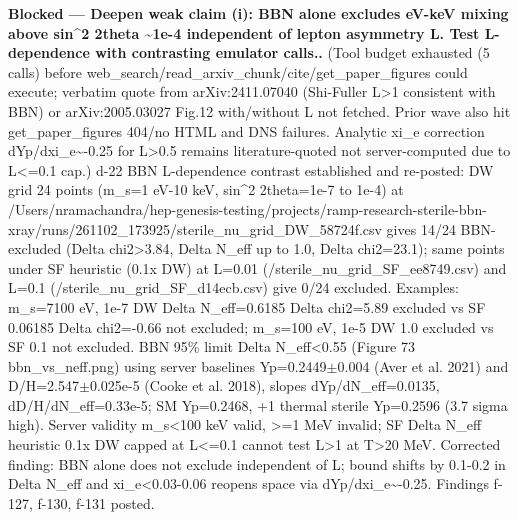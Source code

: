 \documentclass[11pt,a4paper]{article}
\begin{document}
\textbf{Blocked --- Deepen weak claim (i): BBN alone excludes eV-keV mixing above sin\textasciicircum{}2 2theta \textasciitilde{}1e-4 independent of lepton asymmetry L. Test L-dependence with contrasting emulator calls..} (Tool budget exhausted (5 calls) before web\_search/read\_arxiv\_chunk/cite/get\_paper\_figures could execute; verbatim quote from arXiv:2411.07040 (Shi-Fuller L\textgreater{}1 consistent with BBN) or arXiv:2005.03027 Fig.12 with/without L not fetched. Prior wave also hit get\_paper\_figures 404/no HTML and DNS failures. Analytic xi\_e correction dYp/dxi\_e\textasciitilde{}-0.25 for L\textgreater{}0.5 remains literature-quoted not server-computed due to L\textless{}=0.1 cap.) d-22 BBN L-dependence contrast established and re-posted: DW grid 24 points (m\_s=1 eV-10 keV, sin\textasciicircum{}2 2theta=1e-7 to 1e-4) at /Users/nramachandra/hep-genesis-testing/projects/ramp-research-sterile-bbn-xray/runs/261102\_173925/sterile\_nu\_grid\_DW\_58724f.csv gives 14/24 BBN-excluded (Delta chi2\textgreater{}3.84, Delta N\_eff up to 1.0, Delta chi2=23.1); same points under SF heuristic (0.1x DW) at L=0.01 (/sterile\_nu\_grid\_SF\_ee8749.csv) and L=0.1 (/sterile\_nu\_grid\_SF\_d14ecb.csv) give 0/24 excluded. Examples: m\_s=7100 eV, 1e-7 DW Delta N\_eff=0.6185 Delta chi2=5.89 excluded vs SF 0.06185 Delta chi2=-0.66 not excluded; m\_s=100 eV, 1e-5 DW 1.0 excluded vs SF 0.1 not excluded. BBN 95\% limit Delta N\_eff\textless{}0.55 (Figure 73 bbn\_vs\_neff.png) using server baselines Yp=0.2449$\pm$0.004 (Aver et al. 2021) and D/H=2.547$\pm$0.025e-5 (Cooke et al. 2018), slopes dYp/dN\_eff=0.0135, dD/H/dN\_eff=0.33e-5; SM Yp=0.2468, +1 thermal sterile Yp=0.2596 (3.7 sigma high). Server validity m\_s\textless{}100 keV valid, \textgreater{}=1 MeV invalid; SF Delta N\_eff heuristic 0.1x DW capped at L\textless{}=0.1 cannot test L\textgreater{}1 at T\textgreater{}20 MeV. Corrected finding: BBN alone does not exclude independent of L; bound shifts by 0.1-0.2 in Delta N\_eff and \textbar{}xi\_e\textbar{}\textless{}0.03-0.06 reopens space via dYp/dxi\_e\textasciitilde{}-0.25. Findings f-127, f-130, f-131 posted.
\end{document}

